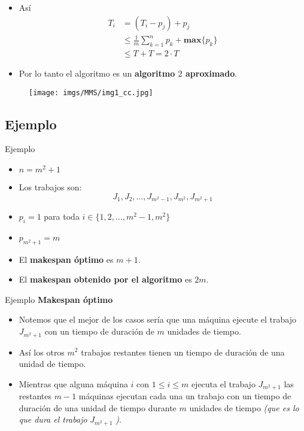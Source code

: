 \begin{frame}{\subsectiontitle}
    \begin{itemize}
        \item Así
        \begin{align*}
            T_{i} &= \left(T_{i} - p_{j} \right) + p_{j} \\
                  &\leq \frac{1}{m}\sum_{k=1}^{n}p_{k} + \mathbf{max}\{p_{k}\} \\
                  &\leq T + T = 2 \cdot T
        \end{align*}
        \item Por lo tanto el algoritmo es un \textbf{algoritmo \(2\) aproximado}.
    \end{itemize}
\end{frame}

\begin{frame}{\subsectiontitle}
    \begin{figure}[H]
        \centering
        \texttt{[image: imgs/MMS/img1\_cc.jpg]}
    \end{figure}
\end{frame}

\renewcommand{\subsectiontitle}{Ejemplo}
\subsection{\subsectiontitle}

\begin{frame}{\subsectiontitle}
    \begin{itemize}
    \item \(n = m^2 + 1\)
    \item Los trabajos son:
    \[
        J_{1}, J_{2}, \dotsc, J_{m^2 - 1}, J_{m^2}, J_{m^2 + 1}
    \]
    \item \(p_{i} = 1\) para toda \(i \in \{1, 2, \dotsc, m^2-1, m^2\}\)
    \item \(p_{m^2 + 1} = m\) 
    \item El \textbf{makespan óptimo} es \(m + 1\).
    \item El \textbf{makespan obtenido por el algoritmo} es \(2m\).
\end{itemize}
\end{frame}

\begin{frame}{\subsectiontitle}
    \textbf{Makespan óptimo}
    \begin{itemize}
        \item Notemos que el mejor de los casos sería que una máquina ejecute el trabajo \(J_{m^2 + 1}\) con un tiempo de duración de \(m\) unidades de tiempo.
        \item Así los otros \(m^2\) trabajos restantes tienen
        un tiempo de duración de una unidad de tiempo.
        \item Mientras que alguna máquina \(i\) con \(1 \leq i \leq m\) ejecuta el trabajo \(J_{m^2+1}\) las restantes \(m-1\) máquinas ejecutan cada una un trabajo con un tiempo de duración de una unidad de tiempo durante \(m\) unidades de tiempo \textit{(que es lo que dura el trabajo} \(J_{m^2+1}\) \textit{)}.
    \end{itemize}
\end{frame}

